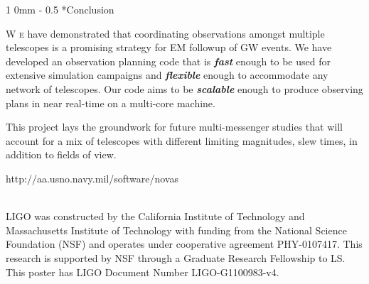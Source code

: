 \documentclass[landscape]{a0poster}
\makeatletter
\newcommand{\dropcap}[2]{\lettrine{\fontspec{Copse}#1}{\textnormal{ #2}}}
\renewcommand{\section}{\@startsection
{section}%
{1}%
{0mm}%
{-\baselineskip}%
{0.5\baselineskip}%
{\fontspec{Marvel Bold}\Huge}} %
\renewcommand{\emph}[1]{{\bfseries\itshape#1}}
\makeatother
\begin{document}
\framebreak

\section*{Conclusion}

\dropcap{W}{e} have demonstrated that coordinating observations amongst multiple telescopes is a promising strategy for EM followup of GW events.  We have developed an observation planning code that is \emph{fast} enough to be used for extensive simulation campaigns and \emph{flexible} enough to accommodate any network of telescopes.  Our code aims to be \emph{scalable} enough to produce observing plans in near real-time on a multi-core machine.

This project lays the groundwork for future multi-messenger studies that will account for a mix of telescopes with different limiting magnitudes, slew times, in addition to fields of view.



\noindent
http://aa.usno.navy.mil/software/novas

\noindent\\
LIGO was constructed by the California Institute of Technology and Massachusetts Institute of Technology with funding from the National Science Foundation (NSF) and operates under cooperative agreement PHY-0107417.  This research is supported by NSF through a Graduate Research Fellowship to LS.  This poster has LIGO Document Number LIGO-G1100983-v4.
\end{document}
